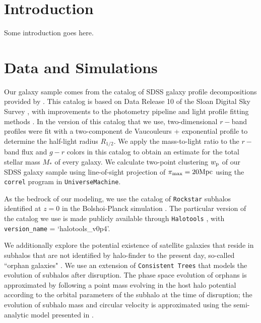 \documentclass[usenatbib,usegraphicx,letterpaper]{mn2e}
\newcommand{\rhalf}{R_{1/2}}
\newcommand{\mstar}{M_{\ast}}
\newcommand{\wproj}{w_{\rm p}}
\newcommand{\mpc}{{\rm Mpc}}
\begin{document}
\section{Introduction}
\label{sec:intro}
Some introduction goes here.

\section{Data and Simulations}
\label{sec:data}

Our galaxy sample comes from the catalog of SDSS galaxy profile decompositions provided by \citet{meert_etal15}. This catalog is based on Data Release 10 of the Sloan Digital Sky Survey \citep[SDSS,][]{ahn_etal14}, with improvements to the photometry pipeline and light profile fitting methods \citep{vikram_etal10,bernardi_etal13,bernardi_etal14,meert_etal13}. In the version of this catalog that we use, two-dimensional $r-$band profiles were fit with a two-component de Vaucouleurs + exponential profile to determine the half-light radius $\rhalf.$ We apply the \citet{bell_etal03} mass-to-light ratio to the $r-$band flux and $g-r$ colors in this catalog to obtain an estimate for the total stellar mass $\mstar$ of every galaxy. We calculate two-point clustering $\wproj$ of our SDSS galaxy sample using line-of-sight projection of $\pi_{\rm max}=20\mpc$ using the {\tt correl} program in {\tt UniverseMachine}. 

As the bedrock of our modeling, we use the catalog of {\tt Rockstar} subhalos identified at $z=0$ in the Bolshoi-Planck simulation \citep{klypin_etal11,behroozi12_rockstar,behroozi12_consistent_trees,riebe_etal13,rodriguez_puebla16_bolplanck}. The particular version of the catalog we use is made publicly available through {\tt Halotools} \citep{hearin_etal16}, with {\tt version\_name} = `halotools\_v0p4'. 

We additionally explore the potential existence of satellite galaxies that reside in subhalos that are not identified by halo-finder to the present day, so-called ``orphan galaxies" \citep[see, e.g.,][]{campbell_etal17}. We use an extension of {\tt Consistent Trees} that models the evolution of subhalos after disruption. The phase space evolution of orphans is approximated by following a point mass evolving in the host halo potential according to the orbital parameters of the subhalo at the time of disruption; the evolution of subhalo mass and circular velocity is approximated using the semi-analytic model presented in \citet{jiang_vdB14}.   
\end{document}
